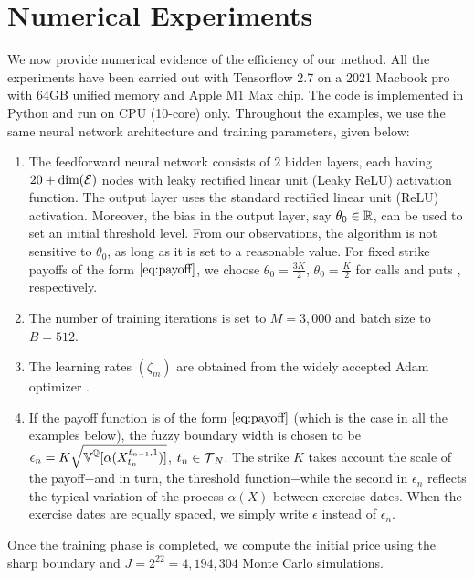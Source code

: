 \section{Numerical Experiments}

We now provide numerical evidence of the efficiency of our method. All the  experiments have been carried out  with Tensorflow 2.7  on a 2021 Macbook pro with 64GB unified memory and Apple M1 Max chip. The code is implemented in Python and run on CPU (10-core) only.  
Throughout the examples, we use the same neural network architecture and training parameters,  given  below:
\begin{enumerate}
\item The feedforward neural network consists of $2$ hidden layers, each having $20 + \text{dim}(\operatorname{\mathcal{E}})$  nodes  with leaky rectified linear unit (Leaky ReLU) activation function. The output layer uses the standard rectified linear unit (ReLU)  activation. Moreover, the  bias in the output layer, say $\theta_0 \in \operatorname{\mathbb{R}}$, can be used to set  an initial threshold level. From our observations, the algorithm is not sensitive to $\theta_0$, as long as it is set to a reasonable value.  For fixed strike payoffs of the form  $\eqref{eq:payoff}$, we  choose $\theta_0=\frac{3K}{2}$,  $\theta_0=\frac{K}{2}$ for  calls 
and puts
,  respectively.




\item The number of training iterations is set to $M=3,000$ and batch size to $B = 512$. 
    \item The learning rates $(\zeta_m)$ are obtained from the widely accepted Adam optimizer \cite{Kingma}.
    
    \item  
    If the payoff function is of the form
    $\eqref{eq:payoff}$ (which is the case in all the examples below), the fuzzy boundary width is chosen to be    
    $\epsilon_n = K \sqrt{\operatorname{\mathbb{V}}^{\operatorname{\mathbb{Q}}}[ \alpha(X^{t_{n-1},1}_{t_n})]}$, $t_n \in \operatorname{\mathcal{T}}_N$. 
     The strike $K$ takes account the scale of the payoff$-$and in turn, the threshold function$-$while  the second in $\epsilon_n$ reflects the typical variation 
     of the  process $\alpha(X)$ between exercise dates. When the exercise dates are equally spaced, we simply write $\epsilon$ instead of $\epsilon_n$. 
\end{enumerate}
Once the training phase is completed,  we compute the initial price using the sharp boundary and $J= 2^{22} = 4,194,304$ Monte Carlo simulations. 

